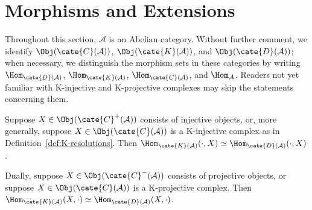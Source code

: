 
\section{Morphisms and Extensions}\label{sec:Hom-Ext}
\hypertarget{o014.aljabr2.chapter4.morphisms-extensions}{ }

Throughout this section, $\mathcal{A}$ is an Abelian category. Without
further comment, we identify
$\Obj(\cate{C}(\mathcal{A}))$, $\Obj(\cate{K}(\mathcal{A}))$, and
$\Obj(\cate{D}(\mathcal{A}))$; when necessary, we distinguish the morphism
sets in these categories by writing
$\Hom_{\cate{D}(\mathcal{A})}$, $\Hom_{\cate{K}(\mathcal{A})}$,
$\Hom_{\cate{C}(\mathcal{A})}$, and $\Hom_{\mathcal{A}}$. Readers not yet
familiar with K-injective and K-projective complexes may skip the statements
concerning them.

\begin{proposition}\label{prop:Hom-D-injective}
	Suppose $X \in \Obj(\cate{C}^+(\mathcal{A}))$ consists of injective
	objects, or, more generally, suppose
	$X \in \Obj(\cate{C}(\mathcal{A}))$ is a K-injective complex as in
	Definition~\ref{def:K-resolutions}. Then
	$\Hom_{\cate{K}(\mathcal{A})}(\cdot, X) \simeq
	\Hom_{\cate{D}(\mathcal{A})}(\cdot, X)$.

	Dually, suppose $X \in \Obj(\cate{C}^-(\mathcal{A}))$ consists of
	projective objects, or suppose
	$X \in \Obj(\cate{C}(\mathcal{A}))$ is a K-projective complex. Then
	$\Hom_{\cate{K}(\mathcal{A})}(X, \cdot) \simeq
	\Hom_{\cate{D}(\mathcal{A})}(X, \cdot)$.
\end{proposition}


